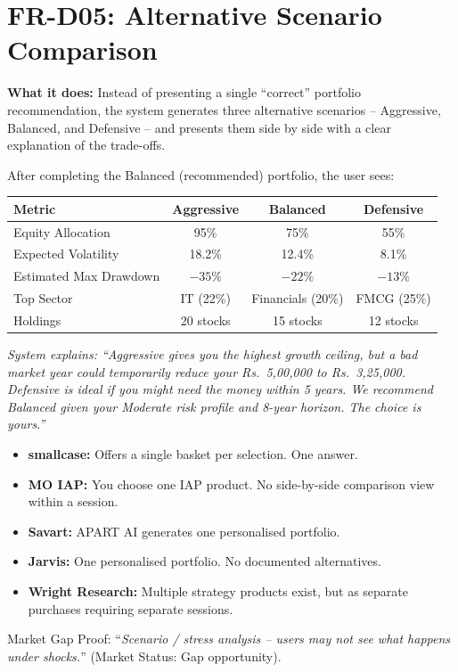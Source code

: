 \documentclass[12pt, a4paper, openany, oneside]{report}
\newcommand{\rupee}{Rs.~}
\begin{document}
\section{FR-D05: Alternative Scenario Comparison}

\textbf{What it does:} Instead of presenting a single ``correct'' portfolio recommendation, the system generates three alternative scenarios -- Aggressive, Balanced, and Defensive -- and presents them side by side with a clear explanation of the trade-offs.

\begin{examplebox}
After completing the Balanced (recommended) portfolio, the user sees:

\begin{center}
\begin{tabular}{|l|c|c|c|}
\hline
\textbf{Metric} & \textbf{Aggressive} & \textbf{Balanced} & \textbf{Defensive} \\
\hline
Equity Allocation & 95\% & 75\% & 55\% \\
Expected Volatility & 18.2\% & 12.4\% & 8.1\% \\
Estimated Max Drawdown & $-35\%$ & $-22\%$ & $-13\%$ \\
Top Sector & IT (22\%) & Financials (20\%) & FMCG (25\%) \\
Holdings & 20 stocks & 15 stocks & 12 stocks \\
\hline
\end{tabular}
\end{center}

\textit{System explains: ``Aggressive gives you the highest growth ceiling, but a bad market year could temporarily reduce your \rupee5,00,000 to \rupee3,25,000. Defensive is ideal if you might need the money within 5 years. We recommend Balanced given your Moderate risk profile and 8-year horizon. The choice is yours.''}
\end{examplebox}

\begin{gapbox}
\begin{itemize}[noitemsep]
  \item \textbf{smallcase:} Offers a single basket per selection. One answer.
  \item \textbf{MO IAP:} You choose one IAP product. No side-by-side comparison view within a session.
  \item \textbf{Savart:} APART AI generates one personalised portfolio.
  \item \textbf{Jarvis:} One personalised portfolio. No documented alternatives.
  \item \textbf{Wright Research:} Multiple strategy products exist, but as separate purchases requiring separate sessions.
\end{itemize}
Market Gap Proof: ``\textit{Scenario / stress analysis -- users may not see what happens under shocks.}'' (Market Status: Gap opportunity).
\end{gapbox}
\end{document}
